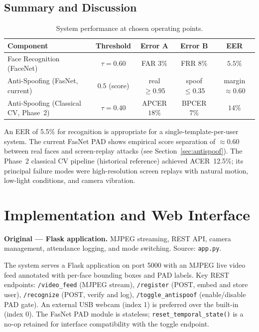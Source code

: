 \documentclass[10pt,a4paper]{article}
\begin{document}
\subsection{Summary and Discussion}

\begin{table}[H]
\centering\small
\caption{System performance at chosen operating points.}
\label{tab:summary}
\renewcommand{\arraystretch}{1.2}
\begin{tabular}{@{}lcccc@{}}
\toprule
\textbf{Component} & \textbf{Threshold} & \textbf{Error A} & \textbf{Error B} & \textbf{EER} \\
\midrule
Face Recognition (FaceNet)            & $\tau=0.60$ & FAR $3\%$    & FRR $8\%$   & $5.5\%$ \\
Anti-Spoofing (FasNet, current)       & $0.5$ (score) & real $\geq\!0.95$ & spoof $\leq\!0.35$ & margin $\approx\!0.60$ \\
Anti-Spoofing (Classical CV, Phase~2) & $\tau=0.40$ & APCER $18\%$ & BPCER $7\%$ & $14\%$ \\
\bottomrule
\end{tabular}
\end{table}

An EER of 5.5\% for recognition is appropriate for a single-template-per-user system.
The current FasNet PAD shows empirical score separation of $\approx\!0.60$ between
real faces and screen-replay attacks (see Section~\ref{sec:antispoof}).
The Phase~2 classical CV pipeline (historical reference) achieved ACER~12.5\%;
its principal failure modes were high-resolution screen replays with natural motion,
low-light conditions, and camera vibration.

\section{Implementation and Web Interface}
\label{sec:impl}

\begin{originalbox}
\textbf{Original --- Flask application.}
MJPEG streaming, REST API, camera management, attendance logging, and mode switching.
Source: \texttt{app.py}.
\end{originalbox}

The system serves a Flask application on port 5000 with an MJPEG live video feed
annotated with per-face bounding boxes and PAD labels.
Key REST endpoints: \texttt{/video\_feed} (MJPEG stream), \texttt{/register} (POST,
embed and store user), \texttt{/recognize} (POST, verify and log), \texttt{/toggle\_antispoof}
(enable/disable PAD gate).
An external USB webcam (index 1) is preferred over the built-in (index 0).
The FasNet PAD module is stateless; \texttt{reset\_temporal\_state()} is a no-op
retained for interface compatibility with the toggle endpoint.
\end{document}
